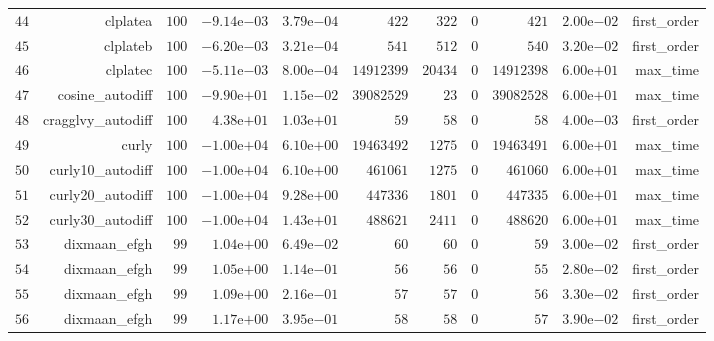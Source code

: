 \documentclass[varwidth=20cm,crop=true]{standalone}
\begin{document}
\begin{longtable}{rrrrrrrrrrr}
  \(    44\) & clplatea & \(   100\) & \(-9.14\)e\(-03\) & \( 3.79\)e\(-04\) & \(   422\) & \(   322\) & \(     0\) & \(   421\) & \( 2.00\)e\(-02\) & first\_order \\
  \(    45\) & clplateb & \(   100\) & \(-6.20\)e\(-03\) & \( 3.21\)e\(-04\) & \(   541\) & \(   512\) & \(     0\) & \(   540\) & \( 3.20\)e\(-02\) & first\_order \\
  \(    46\) & clplatec & \(   100\) & \(-5.11\)e\(-03\) & \( 8.00\)e\(-04\) & \(14912399\) & \( 20434\) & \(     0\) & \(14912398\) & \( 6.00\)e\(+01\) & max\_time \\
  \(    47\) & cosine\_autodiff & \(   100\) & \(-9.90\)e\(+01\) & \( 1.15\)e\(-02\) & \(39082529\) & \(    23\) & \(     0\) & \(39082528\) & \( 6.00\)e\(+01\) & max\_time \\
  \(    48\) & cragglvy\_autodiff & \(   100\) & \( 4.38\)e\(+01\) & \( 1.03\)e\(+01\) & \(    59\) & \(    58\) & \(     0\) & \(    58\) & \( 4.00\)e\(-03\) & first\_order \\
  \(    49\) & curly & \(   100\) & \(-1.00\)e\(+04\) & \( 6.10\)e\(+00\) & \(19463492\) & \(  1275\) & \(     0\) & \(19463491\) & \( 6.00\)e\(+01\) & max\_time \\
  \(    50\) & curly10\_autodiff & \(   100\) & \(-1.00\)e\(+04\) & \( 6.10\)e\(+00\) & \(461061\) & \(  1275\) & \(     0\) & \(461060\) & \( 6.00\)e\(+01\) & max\_time \\
  \(    51\) & curly20\_autodiff & \(   100\) & \(-1.00\)e\(+04\) & \( 9.28\)e\(+00\) & \(447336\) & \(  1801\) & \(     0\) & \(447335\) & \( 6.00\)e\(+01\) & max\_time \\
  \(    52\) & curly30\_autodiff & \(   100\) & \(-1.00\)e\(+04\) & \( 1.43\)e\(+01\) & \(488621\) & \(  2411\) & \(     0\) & \(488620\) & \( 6.00\)e\(+01\) & max\_time \\
  \(    53\) & dixmaan\_efgh & \(    99\) & \( 1.04\)e\(+00\) & \( 6.49\)e\(-02\) & \(    60\) & \(    60\) & \(     0\) & \(    59\) & \( 3.00\)e\(-02\) & first\_order \\
  \(    54\) & dixmaan\_efgh & \(    99\) & \( 1.05\)e\(+00\) & \( 1.14\)e\(-01\) & \(    56\) & \(    56\) & \(     0\) & \(    55\) & \( 2.80\)e\(-02\) & first\_order \\
  \(    55\) & dixmaan\_efgh & \(    99\) & \( 1.09\)e\(+00\) & \( 2.16\)e\(-01\) & \(    57\) & \(    57\) & \(     0\) & \(    56\) & \( 3.30\)e\(-02\) & first\_order \\
  \(    56\) & dixmaan\_efgh & \(    99\) & \( 1.17\)e\(+00\) & \( 3.95\)e\(-01\) & \(    58\) & \(    58\) & \(     0\) & \(    57\) & \( 3.90\)e\(-02\) & first\_order \\

\end{longtable}
\end{document}
